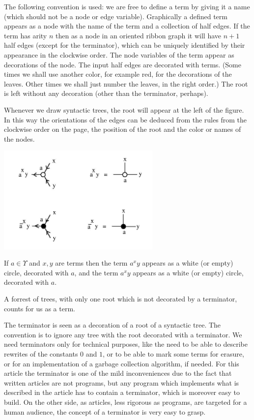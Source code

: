The following convention is used: we are free to define a term by giving it a name (which should not be a node or edge variable). Graphically a defined term appears as a node with the name of the term and a collection of half edges. If the term has arity $n$ then as a node in an oriented ribbon graph it will have $n+1$ half edges (except for the terminator), which can be uniquely identified by their  appearance in the clockwise order. The node variables of the term appear as decorations of the node. The input half edges are decorated with terms. (Some times we shall use another color, for example red, for the decorations of the leaves. Other times we shall just number the leaves, in the right order.) The root is left without any decoration (other than the terminator, perhaps). 

Whenever we draw syntactic trees, the root will appear at the left of the figure. In this way the orientations of the edges can be deduced from the rules from the clockwise order on the page, the position of the root and the color or names of the nodes. 

\vspace{.5cm} 
\centerline{\includegraphics[width=80mm]{jpg/shuffle_00.jpg}} \vspace{.5cm} 

If $a \in \Upsilon$ and $x , y$ are terms then the term $\displaystyle a^{x}y$ appears as a white (or empty) circle, decorated with $a$, and the term $\displaystyle a^{x}y$ appears as a white (or empty) circle, decorated with $a$. 



A forrest of trees, with only one root which is not decorated by a terminator, counts for us as a term. 

The terminator is seen as a decoration of a root of a syntactic tree. The convention is to ignore any tree with the root decorated with a terminator. We need terminators only for technical purposes, like the need to be able to describe rewrites of the constants $0$ and $1$, or to be able to mark some terms for erasure, or for an implementation of a garbage collection algorithm, if needed. For this article the terminator is one of the mild inconveniences due to the fact that written articles are not programs, but any program which implements what is described in the article has to contain a terminator, which is moreover easy to build. On the other side, as articles, less rigorous as programs, are targeted for a human audience,  the concept of a terminator is very easy to grasp. 



